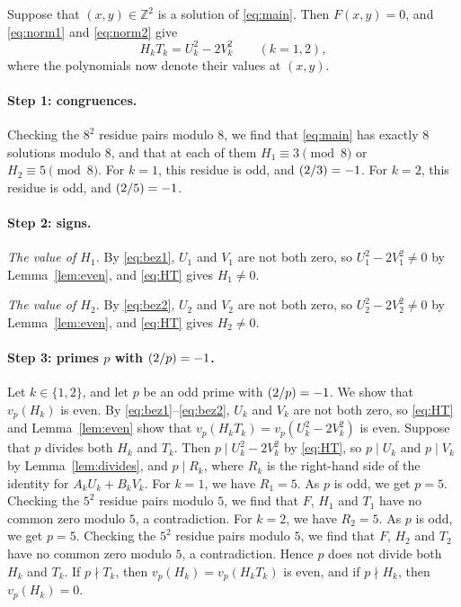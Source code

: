 \documentclass[11pt]{article}
\newcommand{\Z}{\mathbb{Z}}
\newcommand{\leg}[2]{\mathchoice{\biggl(\dfrac{#1}{#2}\biggr)}{(#1/#2)}{(#1/#2)}{(#1/#2)}}
\begin{document}
Suppose that $(x,y)\in\Z^2$ is a solution of \eqref{eq:main}. Then $F(x,y)=0$, and \eqref{eq:norm1} and \eqref{eq:norm2} give
\begin{equation}\label{eq:HT}
H_kT_k=U_k^2-2V_k^2\qquad(k=1,2),
\end{equation}
where the polynomials now denote their values at $(x,y)$.

\paragraph{Step 1: congruences.} Checking the $8^2$ residue pairs modulo $8$, we find that \eqref{eq:main} has exactly 8 solutions modulo $8$, and that at each of them $H_{1}\equiv3\pmod{8}$ or $H_{2}\equiv5\pmod{8}$. For $k=1$, this residue is odd, and $\leg{2}{3}=-1$. For $k=2$, this residue is odd, and $\leg{2}{5}=-1$.

\paragraph{Step 2: signs.} \emph{The value of $H_{1}$.} By \eqref{eq:bez1}, $U_{1}$ and $V_{1}$ are not both zero, so $U_{1}^2-2V_{1}^2\neq0$ by Lemma~\ref{lem:even}, and \eqref{eq:HT} gives $H_{1}\neq0$.

\emph{The value of $H_{2}$.} By \eqref{eq:bez2}, $U_{2}$ and $V_{2}$ are not both zero, so $U_{2}^2-2V_{2}^2\neq0$ by Lemma~\ref{lem:even}, and \eqref{eq:HT} gives $H_{2}\neq0$.

\paragraph{Step 3: primes $p$ with $\leg{2}{p}=-1$.} Let $k\in\{1,2\}$, and let $p$ be an odd prime with $\leg{2}{p}=-1$. We show that $v_p(H_k)$ is even. By \eqref{eq:bez1}--\eqref{eq:bez2}, $U_k$ and $V_k$ are not both zero, so \eqref{eq:HT} and Lemma~\ref{lem:even} show that $v_p(H_kT_k)=v_p(U_k^2-2V_k^2)$ is even. Suppose that $p$ divides both $H_k$ and $T_k$. Then $p\mid U_k^2-2V_k^2$ by \eqref{eq:HT}, so $p\mid U_k$ and $p\mid V_k$ by Lemma~\ref{lem:divides}, and $p\mid R_k$, where $R_k$ is the right-hand side of the identity for $A_kU_k+B_kV_k$. For $k=1$, we have $R_{1}=5$. As $p$ is odd, we get $p=5$. Checking the $5^2$ residue pairs modulo $5$, we find that $F$, $H_{1}$ and $T_{1}$ have no common zero modulo $5$, a contradiction. For $k=2$, we have $R_{2}=5$. As $p$ is odd, we get $p=5$. Checking the $5^2$ residue pairs modulo $5$, we find that $F$, $H_{2}$ and $T_{2}$ have no common zero modulo $5$, a contradiction. Hence $p$ does not divide both $H_k$ and $T_k$. If $p\nmid T_k$, then $v_p(H_k)=v_p(H_kT_k)$ is even, and if $p\nmid H_k$, then $v_p(H_k)=0$.
\end{document}
